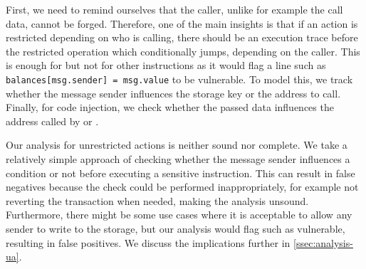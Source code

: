 First, we need to remind ourselves that the caller, unlike for example the call data, cannot be forged.
Therefore, one of the main insights is that if an action is restricted depending on who is calling, there should be an execution trace before the restricted operation which conditionally jumps, depending on the caller.
This is enough for  but not for other instructions as it would flag a line such as \lstinline{balances[msg.sender] = msg.value} to be vulnerable.
To model this, we track whether the message sender influences the storage key or the address to call.
Finally, for code injection, we check whether the passed data influences the address called by  or .

\correctness Our analysis for unrestricted actions is neither sound nor complete.
We take a relatively simple approach of checking whether the message sender influences a condition or not before executing a sensitive instruction.
This can result in false negatives because the check could be performed inappropriately, for example not reverting the transaction when needed, making the analysis unsound.
Furthermore, there might be some use cases where it is acceptable to allow any sender to write to the storage, but our analysis would flag such as vulnerable, resulting in false positives.
We discuss the implications further in \autoref{ssec:analysis-ua}.

